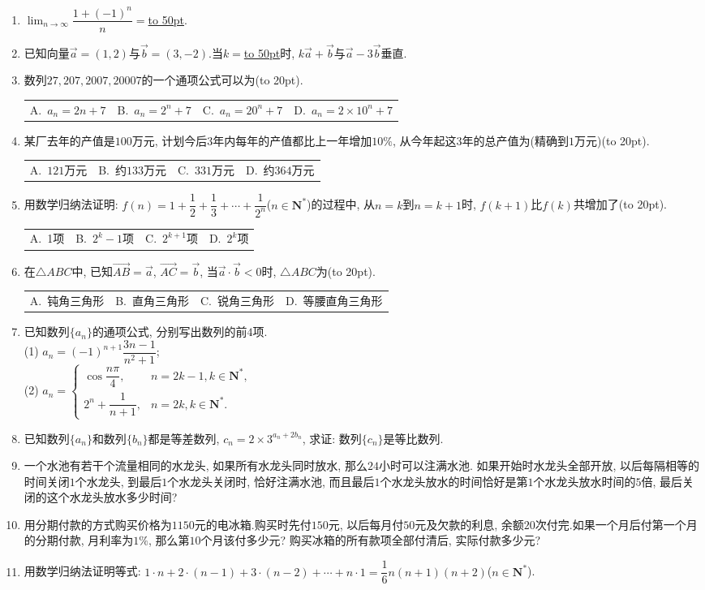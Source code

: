 \documentclass[10pt,a4paper]{article}
\newcommand{\blank}[1]{\underline{\hbox to #1pt{}}}
\newcommand{\bracket}[1]{(\hbox to #1pt{})}
\newcommand{\fourch}[4]{\par\begin{tabular}{p{.23\textwidth}p{.23\textwidth}p{.23\textwidth}p{.23\textwidth}}
A.~#1 &B.~#2& C.~#3& D.~#4
\end{tabular}}
\begin{document}
\begin{enumerate}[1.]
\item $\displaystyle\lim_{n\to\infty}\dfrac{1+(-1)^n}n=$\blank{50}.
\item 已知向量$\overrightarrow a=(1,2)$与$\overrightarrow b=(3,-2)$.当$k=$\blank{50}时, $k\overrightarrow a+\overrightarrow b$与$\overrightarrow a-3\overrightarrow b$垂直.
\item 数列$27, 207, 2 007, 20 007$的一个通项公式可以为\bracket{20}.
\fourch{$a_n=2n+7$}{$a_n=2^n+7$}{$a_n=20^n+7$}{$a_n=2\times 10^n+7$}
\item 某厂去年的产值是$100$万元, 计划今后$3$年内每年的产值都比上一年增加$10\%$, 从今年起这$3$年的总产值为(精确到$1$万元)\bracket{20}.
\fourch{$121$万元}{约$133$万元}{$331$万元}{约$364$万元}
\item 用数学归纳法证明: $f(n)=1+\dfrac 12+\dfrac 13+\cdots +\dfrac 1{2^n}$($n\in \mathbf{N}^*$)的过程中, 从$n=k$到$n=k+1$时, $f(k+1)$比$f(k)$共增加了\bracket{20}.
\fourch{1项}{$2^k-1$项}{$2^{k+1}$项}{$2^k$项}
\item 在$\triangle ABC$中, 已知$\overrightarrow{AB}=\overrightarrow a$, $\overrightarrow{AC}=\overrightarrow b$, 当$\overrightarrow a\cdot \overrightarrow b<0$时, $\triangle ABC$为\bracket{20}.
\fourch{钝角三角形}{直角三角形}{锐角三角形}{等腰直角三角形}
\item 已知数列$\{a_n\}$的通项公式, 分别写出数列的前$4$项.\\
(1) $a_n=(-1)^{n+1}\dfrac{3n-1}{n^2+1}$;\\
(2) $a_n=\begin{cases}    \cos \dfrac{n\pi }4, & n=2k-1,k\in \mathbf{N}^*,  \\2^n+\dfrac 1{n+1}, & n=2k,k\in \mathbf{N}^*.  \end{cases}$
\item 已知数列$\{a_n\}$和数列$\{b_n\}$都是等差数列, $c_n=2\times 3^{a_n+2b_n}$, 求证: 数列$\{c_n\}$是等比数列.
\item 一个水池有若干个流量相同的水龙头, 如果所有水龙头同时放水, 那么$24$小时可以注满水池. 如果开始时水龙头全部开放, 以后每隔相等的时间关闭$1$个水龙头, 到最后$1$个水龙头关闭时, 恰好注满水池, 而且最后$1$个水龙头放水的时间恰好是第$1$个水龙头放水时间的$5$倍, 最后关闭的这个水龙头放水多少时间?
\item 用分期付款的方式购买价格为$1150$元的电冰箱.购买时先付$150$元, 以后每月付$50$元及欠款的利息, 余额$20$次付完.如果一个月后付第一个月的分期付款, 月利率为$1\%$, 那么第$10$个月该付多少元? 购买冰箱的所有款项全部付清后, 实际付款多少元?
\item 用数学归纳法证明等式:
$1\cdot n+2\cdot (n-1)+3\cdot (n-2)+\cdots +n\cdot 1=\dfrac 16n(n+1)(n+2)$($n\in \mathbf{N}^*$).

\end{enumerate}
\end{document}
